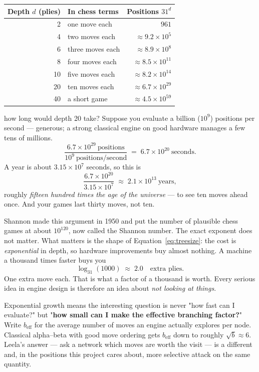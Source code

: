 \begin{center}
\begin{tabular}{@{}rlr@{}}
\toprule
Depth $d$ (plies) & In chess terms & Positions $31^d$ \\
\midrule
2  & one move each        & $961$ \\
4  & two moves each       & $\approx 9.2\times10^{5}$ \\
6  & three moves each     & $\approx 8.9\times10^{8}$ \\
8  & four moves each      & $\approx 8.5\times10^{11}$ \\
10 & five moves each      & $\approx 8.2\times10^{14}$ \\
20 & ten moves each       & $\approx 6.7\times10^{29}$ \\
40 & a short game         & $\approx 4.5\times10^{59}$ \\
\bottomrule
\end{tabular}
\end{center}

\begin{worked}{how long would depth 20 take?}
Suppose you evaluate a billion ($10^9$) positions per second --- generous; a strong
classical engine on good hardware manages a few tens of millions.
\[
  \frac{6.7\times 10^{29}\ \text{positions}}{10^{9}\ \text{positions/second}}
  \;=\; 6.7\times 10^{20}\ \text{seconds}.
\]
A year is about $3.15\times10^{7}$ seconds, so this is
\[
  \frac{6.7\times10^{20}}{3.15\times10^{7}} \;\approx\; 2.1\times10^{13}\ \text{years},
\]
roughly \emph{fifteen hundred times the age of the universe} --- to see ten moves ahead
once. And your games last thirty moves, not ten.
\end{worked}

Shannon made this argument in 1950 and put the number of plausible chess games at about
$10^{120}$, now called the Shannon number. The exact exponent does not matter. What matters
is the shape of Equation~\eqref{eq:treesize}: the cost is \emph{exponential} in depth, so
hardware improvements buy almost nothing. A machine a thousand times faster buys you
\[
  \log_{31}(1000) \;\approx\; 2.0 \quad\text{extra plies.}
\]
One extra move each. That is what a factor of a thousand is worth. Every serious idea in
engine design is therefore an idea about \emph{not looking at things}.

\begin{keyidea}
Exponential growth means the interesting question is never "how fast can I evaluate?" but
"\textbf{how small can I make the effective branching factor?}" Write $b_{\text{eff}}$ for
the average number of moves an engine actually explores per node. Classical alpha--beta
with good move ordering gets $b_{\text{eff}}$ down to roughly $\sqrt{b} \approx 6$. Leela's
answer --- ask a network which moves are worth the visit --- is a different and, in the
positions this project cares about, more selective attack on the same quantity.
\end{keyidea}

